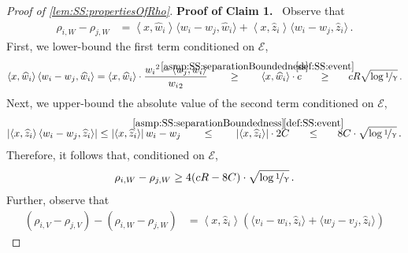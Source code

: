 \documentclass[11pt,letterpaper]{article}
\theoremstyle{plain}
\theoremstyle{definition}
\theoremstyle{remark}
\newcommand{\Stackrel}[2]{\stackrel{\mathmakebox[\widthof{\ensuremath{#2}}]{#1}}{#2}}
\def\abs#1{\left| #1 \right|}
\newcommand{\sinangle}[1]{\ensuremath{\langle#1\rangle}}
\newcommand{\inparen}[1]{\ensuremath{\left(#1\right)}}
\newcommand{\inangle}[1]{\left\langle#1\right\rangle}
\let\norm\relax
\newcommand{\norm}[1]{\ensuremath{\left\lVert #1 \right\rVert}}
\newcommand{\evE}{\ensuremath{\mathscr{E}}}
\newcommand{\nfrac}[2]{\nicefrac{#1}{#2}}
\newcommand{\wh}[1]{\widehat{#1}}
\renewcommand{\paragraph}[1]{\medskip \noindent\textbf{#1}~}
\renewcommand{\gamma}{\upgamma}
\begin{document}
{{{\begin{proof}[Proof of \cref{lem:SS:propertiesOfRho}]
            \paragraph{Proof of Claim 1.}
                Observe that
                \begin{align*}
                    \rho_{i,W} - \rho_{j,W}
                    &=
                    \inangle{x,\wh{w}_i}\sinangle{w_i - w_j, \wh{w}_i}
                    +
                    \inangle{x,\wh{z}_i}\sinangle{w_i - w_j, \wh{z}_i}\,.
                \end{align*}
                First, we lower-bound the first term conditioned on $\evE$, 
                \begin{align*}
                    \inangle{x,\wh{w}_i}\sinangle{w_i - w_j, \wh{w}_i}
                    = \inangle{x,\wh{w}_i}
                    \cdot 
                    \frac{\norm{w_i}^2 - \sinangle{w_j,w_i}}{
                        {\norm{w_i}_2}
                    }
                    \quad~~~\Stackrel{\rm \cref{asmp:SS:separationBoundedness}}{\geq}\quad~~~ \inangle{x,\wh{w}_i}\cdot c 
                    ~~\quad\Stackrel{\rm\cref{def:SS:event}}{\geq}\quad~~ cR\sqrt{\log{\nfrac{1}{\gamma}}}\,.
                \end{align*}
                Next, we upper-bound the absolute value of the second term conditioned on $\evE$, 
                \begin{align*}
                    \abs{\inangle{x,\wh{z}_i}\sinangle{w_i - w_j, \wh{z}_i}}
                    \leq \abs{\inangle{x,\wh{z}_i}}\norm{w_i - w_j}
                    \quad~~~\Stackrel{\rm\cref{asmp:SS:separationBoundedness}}{\leq}\quad~~~ \abs{\inangle{x,\wh{z}_i}}\cdot 2C  
                    \quad~~\Stackrel{\rm\cref{def:SS:event}}{\leq}\quad~~ 
                    8C \cdot \sqrt{\log{\nfrac{1}{\gamma}}}\,.
                \end{align*}
                Therefore, it follows that, conditioned on $\evE$,  
                \[
                    \rho_{i,W} - \rho_{j,W} 
                    \geq
                        4(cR-8C)\cdot\sqrt{\log{\nfrac{1}{\gamma}}}\,.
                \]
                Further, observe that 
                \begin{align*}
                    \inparen{\rho_{i,V} - \rho_{j,V}}
                    - \inparen{\rho_{i,W} - \rho_{j,W}}
                    &= 
                    \inangle{x,\wh{z}_i}
                    \inparen{
                        \sinangle{v_i - w_i, \wh{z}_i}
                        + \sinangle{w_j - v_j, \wh{z}_i}
}
\end{align*}
\end{proof}}}}
\end{document}
